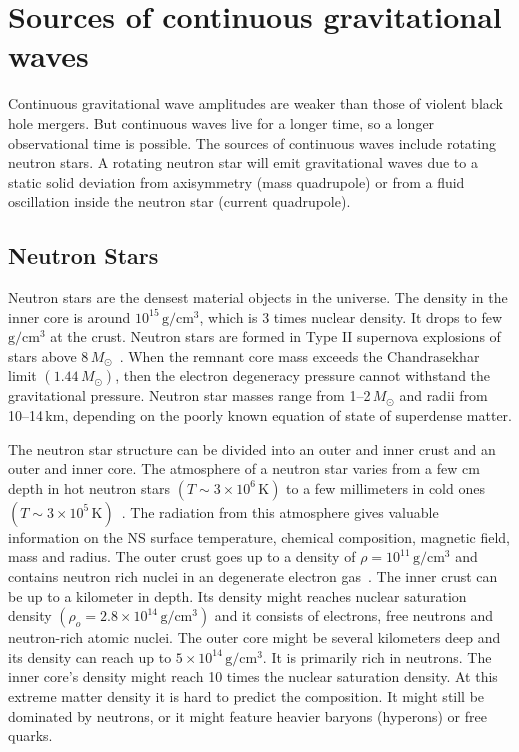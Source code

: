 \documentclass{ttuthes2007}
\begin{document}
\section{Sources of continuous gravitational waves}
Continuous gravitational wave amplitudes are weaker than those of violent black
hole mergers. But continuous waves live for a longer time, so a longer
observational time is possible. The sources of continuous waves include rotating
neutron stars. A rotating neutron star will emit gravitational waves due to a
static solid deviation from axisymmetry (mass quadrupole) or from a fluid
oscillation inside the neutron star (current quadrupole). 

\subsection{Neutron Stars}
Neutron stars are the densest material objects in the universe. The density in
the inner core is around $10^{15}$\,$\mathrm{g/cm^3}$, which is 3 times nuclear
density. It drops to few $\mathrm{g/cm^3}$ at the crust. Neutron stars are
formed in Type II supernova explosions of stars above
$8\,M_\odot$~\cite{Lattimer_2004}. When the remnant core mass exceeds the
Chandrasekhar limit $(1.44\,M_\odot)$, then the electron degeneracy pressure
cannot withstand the gravitational pressure. Neutron star masses range from
1--2\,$M_\odot$ and radii from 10--14\,km, depending on the poorly known
equation of state of superdense matter. 
	
The neutron star structure can be divided into an outer and inner crust and an
outer and inner core. The atmosphere of a neutron star varies from a few cm
depth in hot neutron stars $(T\sim3\times10^6\,\mathrm{K})$ to a few millimeters
in cold ones $(T\sim3\times10^5\,\mathrm{K})$~\cite{Haensel:2007yy}. The
radiation from this atmosphere gives valuable information on the \ac{NS} surface
temperature, chemical composition, magnetic field, mass and radius. The outer
crust goes up to a density of $\rho=10^{11}\,\mathrm{g/cm^3}$ and contains
neutron rich nuclei in an degenerate electron gas~\cite{1976ApJ...208..550P}.
The inner crust can be up to a kilometer in depth. Its density might reaches
nuclear saturation density $(\rho_o=2.8\times10^{14}\,\mathrm{g/cm^3})$ and it
consists of electrons, free neutrons and neutron-rich atomic nuclei. The outer
core might be several kilometers deep and its density can reach up to
$5\times10^{14}\,\mathrm{g/cm^3}$.  It is primarily rich in neutrons. The inner
core's density might reach 10 times the nuclear saturation density.
At this extreme matter density it is hard to predict the composition. It might
still be dominated by neutrons, or it might feature heavier baryons (hyperons)
or free quarks. 
\end{document}
